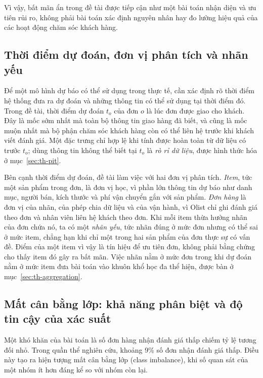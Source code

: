 \documentclass[12pt,a4paper]{report}
\begin{document}
Vì vậy, bất mãn ẩn trong đề tài được tiếp cận như một bài toán nhận diện và ưu tiên rủi ro, không phải bài toán xác định nguyên nhân hay đo lường hiệu quả của các hoạt động chăm sóc khách hàng.

\subsection{Thời điểm dự đoán, đơn vị phân tích và nhãn yếu}\label{sec:con-units}

Để một mô hình dự báo có thể sử dụng trong thực tế, cần xác định rõ thời điểm hệ thống đưa ra dự đoán và những thông tin có thể sử dụng tại thời điểm đó. Trong đề tài, thời điểm dự đoán $t_o$ của đơn $o$ là lúc đơn được giao cho khách. Đây là mốc sớm nhất mà toàn bộ thông tin giao hàng đã biết, và cũng là mốc muộn nhất mà bộ phận chăm sóc khách hàng còn có thể liên hệ trước khi khách viết đánh giá. Một đặc trưng chỉ hợp lệ khi tính được hoàn toàn từ dữ liệu có trước $t_o$; dùng thông tin không thể biết tại $t_o$ là \emph{rò rỉ dữ liệu}, được hình thức hóa ở mục~\ref{sec:th-pit}.

Bên cạnh thời điểm dự đoán, đề tài làm việc với hai đơn vị phân tích. \emph{Item}, tức một sản phẩm trong đơn, là đơn vị học, vì phần lớn thông tin dự báo như danh mục, người bán, kích thước và phí vận chuyển gắn với sản phẩm. \emph{Đơn hàng} là đơn vị của nhãn, của phép chia dữ liệu và của vận hành, vì Olist chỉ ghi đánh giá theo đơn và nhân viên liên hệ khách theo đơn. Khi mỗi item thừa hưởng nhãn của đơn chứa nó, ta có một \emph{nhãn yếu}, tức nhãn đúng ở mức đơn nhưng có thể sai ở mức item, chẳng hạn khi chỉ một trong hai sản phẩm của đơn thực sự có vấn đề. Điểm của một item vì vậy là tín hiệu để ưu tiên đơn, không phải bằng chứng cho thấy item đó gây ra bất mãn. Việc nhãn nằm ở mức đơn trong khi dự đoán nằm ở mức item đưa bài toán vào khuôn khổ học đa thể hiện, được bàn ở mục~\ref{sec:th-aggregation}.

\subsection{Mất cân bằng lớp: khả năng phân biệt và độ tin cậy của xác suất}\label{sec:con-imbalance}

Một khó khăn của bài toán là số đơn hàng nhận đánh giá thấp chiếm tỷ lệ tương đối nhỏ. Trong quần thể nghiên cứu, khoảng 9\% số đơn nhận đánh giá thấp. Điều này tạo ra hiện tượng mất cân bằng lớp (class imbalance), khi số quan sát của một nhóm ít hơn đáng kể so với nhóm còn lại.
 
\end{document}
